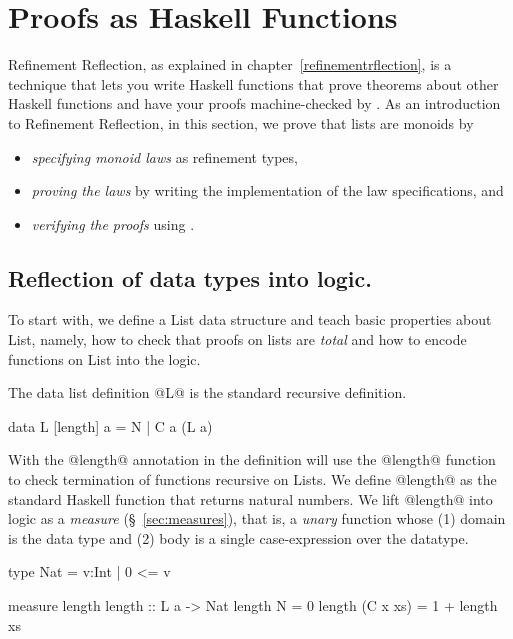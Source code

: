 \section{Proofs as Haskell Functions}\label{sec:haskell-proofs}

Refinement Reflection, as explained in chapter~\ref{refinementrflection}, is a technique
that lets you write Haskell functions that prove theorems
about other Haskell functions and have your proofs machine-checked
by \toolname.
%
As an introduction to Refinement Reflection,
in this section, we prove that lists are monoids by
\begin{itemize}
\item \textit{specifying monoid laws} as refinement types,
\item \textit{proving the laws} by writing the implementation of the law specifications, and
\item \textit{verifying the proofs} using \toolname.
\end{itemize}

\subsection{Reflection of data types into logic.}
To start with,
we define a List data structure and
teach \toolname basic properties about List,
namely, how to check that proofs on lists are \textit{total}
and how to encode functions on List into the logic.

The data list definition @L@ is the standard recursive definition.
\begin{code}
  data L [length] a = N | C a (L a)
\end{code}
%
With the @length@ annotation in the definition \toolname
will use the @length@ function to check termination
of functions recursive on Lists.
%
We define @length@ as the standard Haskell function
that returns natural numbers.
%
We lift @length@ into logic as a \textit{measure} (\S~\ref{sec:measures}),
that is, a \textit{unary} function whose (1) domain is the data type and
(2) body is a single case-expression over the datatype.
\begin{code}
  type Nat = {v:Int | 0 <= v}

  measure length
  length         :: L a -> Nat
  length N        = 0
  length (C x xs) = 1 + length xs
\end{code}

